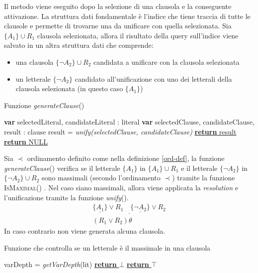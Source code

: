 Il metodo viene eseguito dopo la selezione di una clausola e la conseguente attivazione. La struttura dati fondamentale 
è l'indice che tiene traccia di tutte le clausole e permette di trovarne una da unificare con quella selezionata.
Sia $\{A_1\}\cup R_1$ clausola selezionata, allora il risultato della query sull'indice viene salvato 
in un altra struttura dati che comprende:
\begin{itemize}
    \item una clausola $\{\lnot A_2\}\cup R_2$ candidata a unificare con la clausola selezionata 
    \item un letterale $\{\lnot A_2\}$ candidato all'unificazione con uno dei letterali della clausola selezionata (in questo caso $\{A_1\}$)
\end{itemize} 
\begin{algorithm}[H]
    \caption{Funzione \emph{generateClause}()}
    \begin{algorithmic}
        \State \textbf{var} selectedLiteral, candidateLiteral : literal
        \State \textbf{var} selectedClause, candidateClause, result : clause
            \State result = \emph{unify(selectedClause, candidateClause)}
            \State \underline{\textbf{return} result}
        \Else
            \State \underline{\textbf{return} NULL}
        \EndIf
    \end{algorithmic}
\end{algorithm}
Sia $\prec$ ordinamento definito come nella definizione \ref{ord-def},
la funzione \emph{generateClause}() verifica se il letterale 
$\{A_1\}$ in $\{A_1\}\cup R_1$ e il letterale $\{\lnot A_2\}$ in $\{\lnot A_2\}\cup R_2$ sono massimali 
(secondo l'ordinamento $\prec$) tramite la funzione \textsc{IsMaximal}() .
Nel caso siano massimali, allora viene applicata la \emph{resolution} e l'unificazione tramite la funzione \emph{unify}().
\begin{equation*}
    \begin{gathered}
        \underline{\{\underline{A_1}\} \lor R_1 \quad\{\underline{\lnot A_2}\}\lor R_2}\\
        (R_1 \lor R_2)\theta
    \end{gathered}
\end{equation*}
In caso contrario non viene generata alcuna clausola.
\begin{algorithm}[H]
    \caption{Funzione che controlla se un letterale è il massimale in una clausola}
    \begin{algorithmic}
                \State varDepth = \emph{getVarDepth}(lit)
                    \State \underline{\textbf{return} $\bot$}
                \EndIf
            \EndFor
            \State \underline{\textbf{return} $\top$}
        \EndFunction
    \end{algorithmic}
\end{algorithm}
